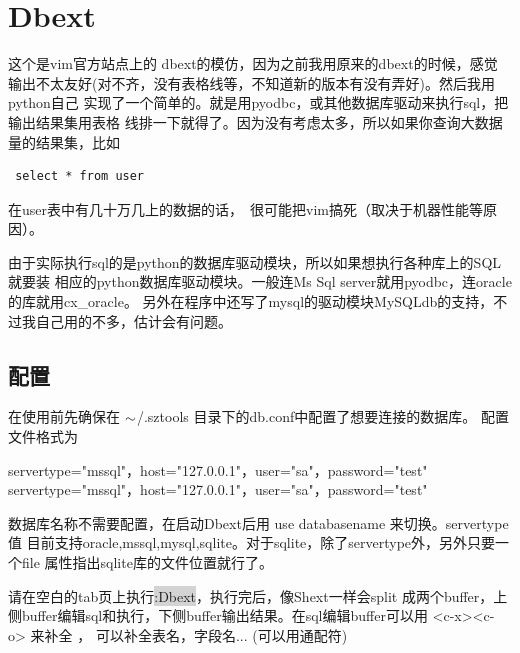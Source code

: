 \documentclass[oneside,openany]{book}
\begin{document}
\section{Dbext}

  这个是vim官方站点上的 dbext的模仿，因为之前我用原来的dbext的时候，感觉
输出不太友好(对不齐，没有表格线等，不知道新的版本有没有弄好)。然后我用python自己
实现了一个简单的。就是用pyodbc，或其他数据库驱动来执行sql，把输出结果集用表格
线排一下就得了。因为没有考虑太多，所以如果你查询大数据量的结果集，比如 
\begin{verbatim} select * from user \end{verbatim}
在user表中有几十万几上的数据的话，　很可能把vim搞死（取决于机器性能等原因）。

由于实际执行sql的是python的数据库驱动模块，所以如果想执行各种库上的SQL就要装
相应的python数据库驱动模块。一般连Ms Sql server就用pyodbc，连oracle的库就用cx\_oracle。
另外在程序中还写了mysql的驱动模块MySQLdb的支持，不过我自己用的不多，估计会有问题。

\subsection{配置}
   在使用前先确保在 $\tiny{\sim}$/.sztools 目录下的db.conf中配置了想要连接的数据库。
   配置文件格式为
    \begin{mdframed}[style=SmallFrame]
    \begin{flushleft}
    servertype="mssql"，host="127.0.0.1"，user="sa"，password="test"\newline
    servertype="mssql"，host="127.0.0.1"，user="sa"，password="test"
    \end{flushleft}
    \end{mdframed}
    数据库名称不需要配置，在启动Dbext后用 use databasename 来切换。servertype值
目前支持oracle,mssql,mysql,sqlite。对于sqlite，除了servertype外，另外只要一个file
属性指出sqlite库的文件位置就行了。

    请在空白的tab页上执行\colorbox{lightgray}{:Dbext}，执行完后，像Shext一样会split
成两个buffer，上侧buffer编辑sql和执行，下侧buffer输出结果。在sql编辑buffer可以用 
<c-x><c-o> 来补全 ， 可以补全表名，字段名... (可以用通配符) 
\end{document}
